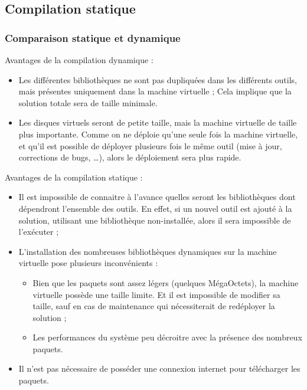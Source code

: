 \subsection{Compilation statique}
\label{Compilation statique}


\subsubsection{Comparaison statique et dynamique}

Avantages de la compilation dynamique :
\begin{itemize}
	\item Les différentes bibliothèques ne sont pas dupliquées dans les différents outils, mais présentes uniquement dans la machine virtuelle ;
Cela implique que la solution totale sera de taille minimale.
	\item Les disques virtuels seront de petite taille, mais la machine virtuelle de taille plus importante.
Comme on ne déploie qu'une seule fois la machine virtuelle, et qu'il est possible de déployer plusieurs fois le même outil (mise à jour, corrections de bugs, \ldots), alors le déploiement sera plus rapide.
\\
\end{itemize}


Avantages de la compilation statique :
\begin{itemize}
	\item Il est impossible de connaitre à l'avance quelles seront les bibliothèques dont dépendront l'ensemble des outils.
En effet, si un nouvel outil est ajouté à la solution, utilisant une bibliothèque non-installée, alors il sera impossible de l'exécuter ;
	\item L'installation des nombreuses bibliothèques dynamiques sur la machine virtuelle pose plusieurs inconvénients :
		\begin{itemize}
			\item Bien que les paquets sont assez légers (quelques MégaOctets), la machine virtuelle possède une taille limite.
Et il est impossible de modifier sa taille, sauf en cas de maintenance qui nécessiterait de redéployer la solution ;
			\item Les performances du système peu décroitre avec la présence des nombreux paquets.
		\end{itemize}
	\item Il n'est pas nécessaire de posséder une connexion internet pour télécharger les paquets.
\\
\end{itemize}


